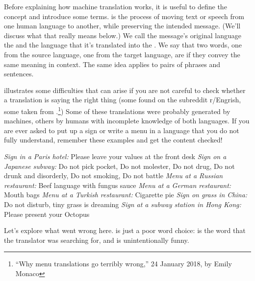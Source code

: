 Before explaining how machine translation works, it is useful to define the concept and
introduce some terms.
 is the process of moving text or speech from one
human language to another, while preserving the intended message.  (We'll discuss what that really means below.) We call the message's original language  the  and the language that it's translated into the .
We say that two words, one from the source language,  one from the target language, are
 if they convey the same meaning in context. The same idea applies to pairs of phrases and
sentences.

 illustrates some difficulties that can arise if you are not
careful to check whether a translation is saying the right thing (some found on the subreddit r/Engrish, some taken from  .\footnote{``Why menu translations go terribly wrong,'' 24 January 2018, by Emily Monaco})  Some of these translations were probably generated by machines, others by humans with incomplete knowledge of both languages.
If you are ever asked to put up a sign or write a menu in a language
that you do not fully understand, 
remember these examples and get the content checked!

\ea \label{over:confident} \ea \label{paris} \emph{Sign in a Paris hotel:} Please leave your values at the front desk
\ex \label{battle} \emph{Sign on a Japanese subway:} Do not pick pocket, Do not molester, Do not drug, Do not drunk and disorderly, Do not smoking, Do not battle
 \ex \label{beefl} \emph{Menu at a Russian restaurant:} Beef language with fungus sauce
 \ex \label{mouthbags} \emph{Menu at a German restaurant:} Mouth bags %
 \ex  \label{cigarette} \emph{Menu at a Turkish restaurant:} Cigarette pie
 \ex \label{grass} \emph{Sign on grass in China:} Do not disturb, tiny grass is dreaming
  \ex \label{octopus} \emph{Sign at a subway station in Hong Kong:}  Please present your Octopus
  \z 
  \z 




Let's explore what went wrong here.   is just a poor word choice:  is the word that the translator was searching for, and  is unintentionally funny. %


